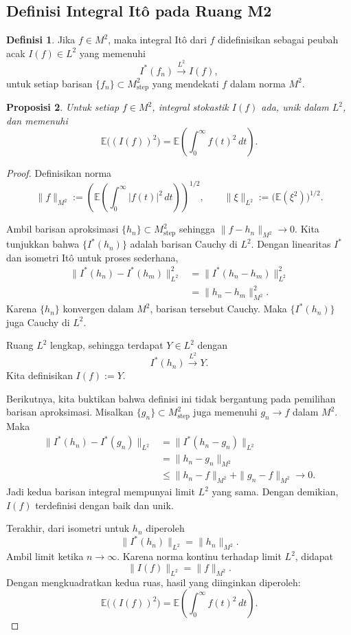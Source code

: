 \documentclass[12pt,a4paper]{article}
\theoremstyle{definition}
\newtheorem{definisi}{Definisi}[section]
\theoremstyle{plain}
\newtheorem{proposisi}[definisi]{Proposisi}
\newcommand{\E}{\mathbb{E}}
\begin{document}
\subsection{Definisi Integral It\^o pada Ruang M2}

\begin{definisi}
  Jika $f\in M^2$, maka integral It\^o dari $f$ didefinisikan sebagai peubah
  acak $I(f)\in L^2$ yang memenuhi
  \[
    I^\ast(f_n)\xrightarrow{L^2}I(f),
  \]
  untuk setiap barisan $\{f_n\}\subset M_{\mathrm{step}}^2$ yang mendekati $f$
  dalam norma $M^2$.
\end{definisi}

\begin{proposisi}
  Untuk setiap $f\in M^2$, integral stokastik $I(f)$ ada, unik dalam $L^2$, dan
  memenuhi
  \[
    \E\bigl((I(f))^2\bigr)
    =
    \E\left(\int_0^\infty f(t)^2\,dt\right).
  \]
\end{proposisi}

\begin{proof}
  Definisikan norma
  \[
    \|f\|_{M^2}
    :=
    \left(
    \E\left(\int_0^\infty |f(t)|^2\,dt\right)
    \right)^{1/2},
    \qquad
    \|\xi\|_{L^2}:=\bigl(\E(\xi^2)\bigr)^{1/2}.
  \]

  Ambil barisan aproksimasi $\{h_n\}\subset M_{\mathrm{step}}^2$ sehingga
  $\|f-h_n\|_{M^2}\to 0$. Kita tunjukkan bahwa $\{I^\ast(h_n)\}$ adalah barisan
  Cauchy di $L^2$. Dengan linearitas $I^\ast$ dan isometri It\^o untuk proses
  sederhana,
  \begin{align*}
    \|I^\ast(h_n)-I^\ast(h_m)\|_{L^2}^2
     & =
    \|I^\ast(h_n-h_m)\|_{L^2}^2 \\
     & =
    \|h_n-h_m\|_{M^2}^2.
  \end{align*}
  Karena $\{h_n\}$ konvergen dalam $M^2$, barisan tersebut Cauchy. Maka
  $\{I^\ast(h_n)\}$ juga Cauchy di $L^2$.

  Ruang $L^2$ lengkap, sehingga terdapat $Y\in L^2$ dengan
  \[
    I^\ast(h_n)\xrightarrow{L^2}Y.
  \]
  Kita definisikan $I(f):=Y$.

  Berikutnya, kita buktikan bahwa definisi ini tidak bergantung pada pemilihan
  barisan aproksimasi. Misalkan $\{g_n\}\subset M_{\mathrm{step}}^2$ juga
  memenuhi $g_n\to f$ dalam $M^2$. Maka
  \begin{align*}
    \|I^\ast(h_n)-I^\ast(g_n)\|_{L^2}
     & =
    \|I^\ast(h_n-g_n)\|_{L^2} \\
     & =
    \|h_n-g_n\|_{M^2}         \\
     & \le
    \|h_n-f\|_{M^2}+\|g_n-f\|_{M^2}\to 0.
  \end{align*}
  Jadi kedua barisan integral mempunyai limit $L^2$ yang sama. Dengan demikian,
  $I(f)$ terdefinisi dengan baik dan unik.

  Terakhir, dari isometri untuk $h_n$ diperoleh
  \[
    \|I^\ast(h_n)\|_{L^2}=\|h_n\|_{M^2}.
  \]
  Ambil limit ketika $n\to\infty$. Karena norma kontinu terhadap limit $L^2$,
  didapat
  \[
    \|I(f)\|_{L^2}=\|f\|_{M^2}.
  \]
  Dengan mengkuadratkan kedua ruas, hasil yang diinginkan diperoleh:
  \[
    \E\bigl((I(f))^2\bigr)
    =
    \E\left(\int_0^\infty f(t)^2\,dt\right).
  \]
\end{proof}
\end{document}
